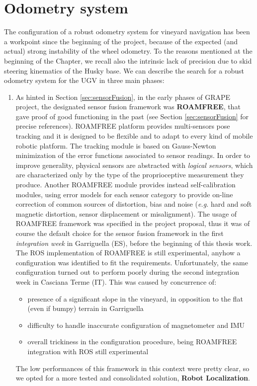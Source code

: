 \section{Odometry system}\label{sec:odometrySystem}

The configuration of a robust odometry system for vineyard navigation has been a workpoint since the beginning of the project, because of the expected (and actual) strong instability of the wheel odometry. To the reasons mentioned at the beginning of the Chapter, we recall also the intrinsic lack of precision due to skid steering kinematics of the Husky base.
We can describe the search for a robust odometry system for the \ac{UGV} in three main phases:
\begin{enumerate}
	\item As hinted in Section \ref{sec:sensorFusion}, in the early phases of \ac{GRAPE} project, the designated sensor fusion framework was \textbf{ROAMFREE}, that gave proof of good functioning in the past (see Section \ref{sec:sensorFusion} for precise references). ROAMFREE platform provides multi-sensors pose tracking and it is designed to be flexible and to adapt to every kind of mobile robotic platform. The tracking module is based on Gauss-Newton minimization of the error functions associated to sensor readings. In order to improve generality, physical sensors are abstracted with \textit{logical sensors}, which are characterized only by the type of the proprioceptive measurement they produce. Another ROAMFREE module provides instead self-calibration modules, using error models for each sensor category to provide on-line correction of common sources of distortion, bias and noise (\textit{e.g.} hard and soft magnetic distortion, sensor displacement or misalignment). The usage of ROAMFREE framework was specified in the project proposal, thus it was of course the default choice for the sensor fusion framework in the first \textit{integration week} in Garriguella (ES), before the beginning of this thesis work. The \ac{ROS} implementation of ROAMFREE is still experimental, anyhow a configuration was identified to fit the requirements. Unfortunately, the same configuration turned out to perform poorly during the second integration week in Casciana Terme (IT). This was caused by concurrence of:
	\begin{itemize}
		\item presence of a significant slope in the vineyard, in opposition to the flat (even if bumpy) terrain in Garriguella
		\item difficulty to handle inaccurate configuration of magnetometer and \ac{IMU}
		\item overall trickiness in the configuration procedure, being ROAMFREE integration with \ac{ROS} still experimental
	\end{itemize}
	The low performances of this framework in this context were pretty clear, so we opted for a more tested and consolidated solution, \textbf{Robot Localization}.
	

\end{enumerate}
